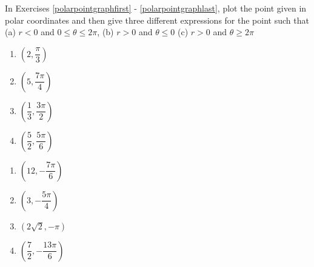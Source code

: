 \documentclass{ximera}
\begin{document}
	\author{Stitz-Zeager}


In Exercises \ref{polarpointgraphfirst} - \ref{polarpointgraphlast}, plot the point given in polar coordinates and then give three different expressions for the point such that \hfill (a) $r < 0$ and $0 \leq \theta \leq 2\pi$, \hfill (b) $r > 0$ and $\theta \leq 0$ \hfill (c) $r > 0$ and $\theta \geq 2\pi$

\begin{multicols}{4}

\begin{enumerate}

\item $\left( 2, \dfrac{\pi}{3} \right)$  \label{polarpointgraphfirst}
\item $\left( 5, \dfrac{7\pi}{4} \right)$
\item $\left( \dfrac{1}{3}, \dfrac{3\pi}{2} \right)$
\item $\left( \dfrac{5}{2}, \dfrac{5\pi}{6} \right)$

\setcounter{HW}{\value{enumi}}

\end{enumerate}

\end{multicols}

\begin{multicols}{4} 

\begin{enumerate}

\setcounter{enumi}{\value{HW}}

\item $\left( 12, -\dfrac{7\pi}{6} \right)$
\item $\left( 3, -\dfrac{5\pi}{4} \right)$
\item $\left( 2\sqrt{2}, -\pi \right)$ 
\item $\left( \dfrac{7}{2}, -\dfrac{13\pi}{6} \right)$

\setcounter{HW}{\value{enumi}}

\end{enumerate}

\end{multicols}
\end{document}
